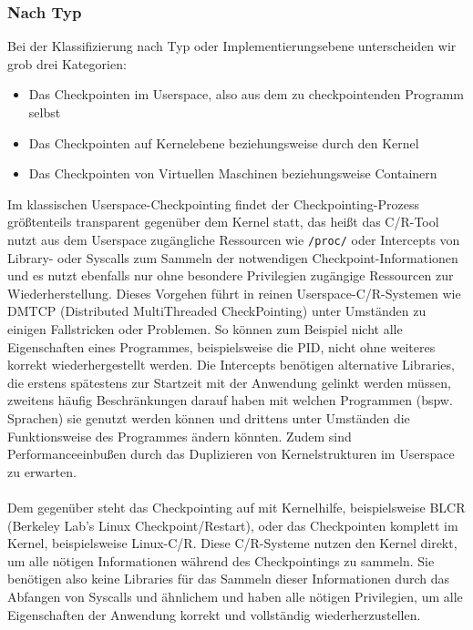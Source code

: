 \documentclass[a4paper]{article}
\begin{document}
\subsubsection{Nach Typ}
Bei der Klassifizierung nach Typ oder Implementierungsebene unterscheiden wir grob drei Kategorien: 
\begin{itemize}
    \item Das Checkpointen im Userspace, also aus dem zu checkpointenden Programm selbst
    \item Das Checkpointen auf Kernelebene beziehungsweise durch den Kernel
    \item Das Checkpointen von Virtuellen Maschinen beziehungsweise Containern
\end{itemize}
Im klassischen Userspace-Checkpointing findet der Checkpointing-Prozess größtenteils transparent gegenüber dem Kernel statt, das heißt das C/R-Tool nutzt aus dem Userspace zugängliche Ressourcen wie \texttt{/proc/} oder Intercepts von Library- oder Syscalls zum Sammeln der notwendigen Checkpoint-Informationen und es nutzt ebenfalls nur ohne besondere Privilegien zugängige Ressourcen zur Wiederherstellung. 
Dieses Vorgehen führt in reinen Userspace-C/R-Systemen wie DMTCP\cite{dmtcp} (Distributed MultiThreaded CheckPointing) unter Umständen zu einigen Fallstricken oder Problemen. 
So können zum Beispiel nicht alle Eigenschaften eines Programmes, beispielsweise die PID, nicht ohne weiteres korrekt wiederhergestellt werden. 
Die Intercepts benötigen alternative Libraries, die erstens spätestens zur Startzeit mit der Anwendung gelinkt werden müssen, zweitens häufig Beschränkungen darauf haben mit welchen Programmen (bspw. Sprachen) sie genutzt werden können und drittens unter Umständen die Funktionsweise des Programmes ändern könnten. Zudem sind Performanceeinbußen durch das Duplizieren von Kernelstrukturen im Userspace zu erwarten.\\ \\
Dem gegenüber steht das Checkpointing auf mit Kernelhilfe, beispielsweise BLCR\cite{BLCR} (Berkeley Lab's Linux Checkpoint/Restart), oder das Checkpointen komplett im Kernel, beispielsweise Linux-C/R\cite{linuxcr}.
Diese C/R-Systeme nutzen den Kernel direkt, um alle nötigen Informationen während des Checkpointings zu sammeln. 
Sie benötigen also keine Libraries für das Sammeln dieser Informationen durch das Abfangen von Syscalls und ähnlichem und haben alle nötigen Privilegien, um alle Eigenschaften der Anwendung korrekt und vollständig wiederherzustellen. 
\end{document}
